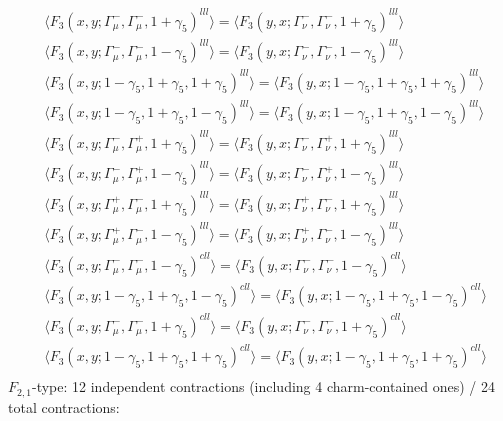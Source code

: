 \begin{align*}
&\Big\langle F_3(x,y;\Gamma_\mu^-,\Gamma_\mu^-,1+\gamma_5)^{lll}\Big\rangle
=\Big\langle F_3(y,x;\Gamma_\nu^-,\Gamma_\nu^-,1+\gamma_5)^{lll}\Big\rangle\\
&\Big\langle F_3(x,y;\Gamma_\mu^-,\Gamma_\mu^-,1-\gamma_5)^{lll}\Big\rangle
=\Big\langle F_3(y,x;\Gamma_\nu^-,\Gamma_\nu^-,1-\gamma_5)^{lll}\Big\rangle\\
&\Big\langle F_3(x,y;1-\gamma_5,1+\gamma_5,1+\gamma_5)^{lll}\Big\rangle
=\Big\langle F_3(y,x;1-\gamma_5,1+\gamma_5,1+\gamma_5)^{lll}\Big\rangle\\
&\Big\langle F_3(x,y;1-\gamma_5,1+\gamma_5,1-\gamma_5)^{lll}\Big\rangle
=\Big\langle F_3(y,x;1-\gamma_5,1+\gamma_5,1-\gamma_5)^{lll}\Big\rangle\\
&\Big\langle F_3(x,y;\Gamma_\mu^-,\Gamma_\mu^+,1+\gamma_5)^{lll}\Big\rangle
=\Big\langle F_3(y,x;\Gamma_\nu^-,\Gamma_\nu^+,1+\gamma_5)^{lll}\Big\rangle\\
&\Big\langle F_3(x,y;\Gamma_\mu^-,\Gamma_\mu^+,1-\gamma_5)^{lll}\Big\rangle
=\Big\langle F_3(y,x;\Gamma_\nu^-,\Gamma_\nu^+,1-\gamma_5)^{lll}\Big\rangle\\
&\Big\langle F_3(x,y;\Gamma_\mu^+,\Gamma_\mu^-,1+\gamma_5)^{lll}\Big\rangle
=\Big\langle F_3(y,x;\Gamma_\nu^+,\Gamma_\nu^-,1+\gamma_5)^{lll}\Big\rangle\\
&\Big\langle F_3(x,y;\Gamma_\mu^+,\Gamma_\mu^-,1-\gamma_5)^{lll}\Big\rangle
=\Big\langle F_3(y,x;\Gamma_\nu^+,\Gamma_\nu^-,1-\gamma_5)^{lll}\Big\rangle\\
&\Big\langle F_3(x,y;\Gamma_\mu^-,\Gamma_\mu^-,1-\gamma_5)^{cll}\Big\rangle
=\Big\langle F_3(y,x;\Gamma_\nu^-,\Gamma_\nu^-,1-\gamma_5)^{cll}\Big\rangle\\
&\Big\langle F_3(x,y;1-\gamma_5,1+\gamma_5,1-\gamma_5)^{cll}\Big\rangle
=\Big\langle F_3(y,x;1-\gamma_5,1+\gamma_5,1-\gamma_5)^{cll}\Big\rangle\\
&\Big\langle F_3(x,y;\Gamma_\mu^-,\Gamma_\mu^-,1+\gamma_5)^{cll}\Big\rangle
=\Big\langle F_3(y,x;\Gamma_\nu^-,\Gamma_\nu^-,1+\gamma_5)^{cll}\Big\rangle\\
&\Big\langle F_3(x,y;1-\gamma_5,1+\gamma_5,1+\gamma_5)^{cll}\Big\rangle
=\Big\langle F_3(y,x;1-\gamma_5,1+\gamma_5,1+\gamma_5)^{cll}\Big\rangle\\
\end{align*}
$F_{2,1}$-type: 12 independent contractions (including 4 charm-contained ones) / 24 total contractions:
